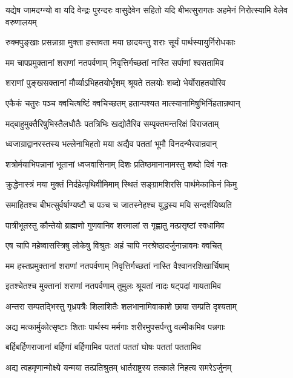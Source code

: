 \threelineshloka
{यद्येष जामदग्न्यो वा यदि वेन्द्रः पुरन्दरः}
{वासुदेवेन सहितो यदि बीभत्सुरागतः}
{अहमेनं निरोत्स्यामि वेलेव वरुणालयम्}


\twolineshloka
{रुक्मपुङ्खाः प्रसन्नाग्रा मुक्ता हस्तवता मया}
{छादयन्तु शराः सूर्यं पार्थस्यायुर्निरोधकाः}


\twolineshloka
{मम चापप्रमुक्तानां शराणां नतपर्वणाम्}
{निवृत्तिर्गच्छतां नास्ति सर्पाणां श्वसतामिव}


\twolineshloka
{शराणां पुङ्खसक्तानां मौर्व्याऽभिहतयोर्भृशम्}
{श्रूयते तलयोः शब्दो भेर्योराहतयोरिव}


\twolineshloka
{एकैकं चतुरः पञ्च क्वचित्षष्टिं क्वचिच्छतम्}
{हतान्पश्यत मात्स्यानामिषुभिर्निहतान्रथान्}


\twolineshloka
{मद्बाहुमुक्तैरिषुभिस्तैलधौतैः पतत्रिभिः}
{खद्योतैरिव सम्पृक्तमन्तरिक्षं विराजताम्}


\twolineshloka
{ध्वजाग्राद्वानरस्तस्य भल्लेनाभिहतो मया}
{अद्यैव पततां भूमौ विनदन्भैरवान्रवान्}


\twolineshloka
{शत्रोर्मयाभिपन्नानां भूतानां ध्वजवासिनाम्}
{दिशः प्रतिष्ठमानानामस्तु शब्दो दिवं गतः}


\twolineshloka
{क्रुद्धेनास्त्रं मया मुक्तं निर्दहेत्पृथिवीमिमाम्}
{स्थितं सङ्ग्रामशिरसि पार्थमेकाकिनं किमु}


\twolineshloka
{समाहितश्च बीभत्सुर्वर्षाण्यष्टौ च पञ्च च}
{जातस्नेहश्च युद्धस्य मयि सन्दर्शयिष्यति}


\twolineshloka
{पात्रीभूतस्तु कौन्तेयो ब्राह्मणो गुणवानिव}
{शरमालां स गृह्णातु मत्प्रसृष्टां स्वधामिव}


\twolineshloka
{एष चापि महेष्वासस्त्रिषु लोकेषु विश्रुतः}
{अहं चापि नरश्रेष्ठादर्जुनान्नावमः क्वचित्}


\twolineshloka
{मम हस्तप्रमुक्तानां शराणां नतपर्वणाम्}
{निवृत्तिर्गच्छतां नास्ति वैश्वानरशिखार्चिषाम्}


\twolineshloka
{इतश्चेतश्च मुक्तानां शराणां नतपर्वणाम्}
{तुमुलः श्रूयतां नादः षट्पदां गायतामिव}


\twolineshloka
{अन्तरा सम्पतद्भिस्तु गृध्रपत्रैः शिलाशितैः}
{शलभानामिवाकाशे छाया सम्प्रति दृश्यताम्}


\twolineshloka
{अद्य मत्कार्मुकोत्सृष्टाः शिताः पार्थस्य मर्मगाः}
{शरीरमुपसर्पन्तु वल्मीकमिव पन्नगाः}


\twolineshloka
{बर्हिबर्हिणराजानां बर्हिणां बर्हिणामिव}
{पततां पततां घोषः पततां पततामिव}


\twolineshloka
{अद्य त्वहमृणान्मोक्ष्ये यन्मया तत्प्रतिश्रुतम्}
{धार्तराष्ट्रस्य तत्काले निहत्य समरेऽर्जुनम्}



